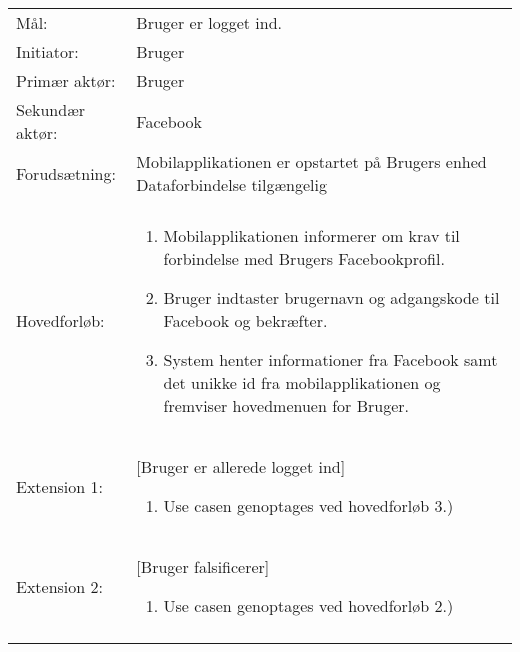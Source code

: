 \begin{tabular}{ >{\raggedleft} p{3cm} | p{12cm} }
Mål: & Bruger er logget ind. \\
Initiator: & Bruger \\
Primær aktør: & Bruger \\
Sekundær aktør: & Facebook \\
Forudsætning: & Mobilapplikationen er opstartet på Brugers enhed \newline
Dataforbindelse tilgængelig
 \\
 & \\
Hovedforløb:  & \begin{enumerate}[label=\arabic*.),itemjoin={\newline},topsep=0pt,partopsep=0pt,itemsep=0pt,leftmargin=*]   
\item Mobilapplikationen informerer om krav til forbindelse med Brugers Facebookprofil. 
\item Bruger indtaster brugernavn og adgangskode til Facebook og bekræfter. 
\item System henter informationer fra Facebook samt det unikke id fra mobilapplikationen og fremviser hovedmenuen for Bruger.
\end{enumerate}\\
Extension 1: & [Bruger er allerede logget ind] \newline
\begin{enumerate}[label=\arabic*.),itemjoin={\newline},topsep=0pt,partopsep=0pt,itemsep=0pt,leftmargin=*]   
\item Use casen genoptages ved hovedforløb 3.) 
\end{enumerate} \\
Extension 2: & [Bruger falsificerer] \newline
\begin{enumerate}[label=\arabic*.),itemjoin={\newline},topsep=0pt,partopsep=0pt,itemsep=0pt,leftmargin=*]   
\item Use casen genoptages ved hovedforløb 2.)
\end{enumerate} \\
& \\
\end{tabular}


\newpage

